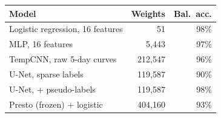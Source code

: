 \begin{tabular}{lrr}
\toprule
Model & Weights & Bal.\ acc. \\
\midrule
Logistic regression, 16 features & 51 & 98\% \\
MLP, 16 features & 5{,}443 & 97\% \\
TempCNN, raw 5-day curves & 212{,}547 & 96\% \\
U-Net, sparse labels & 119{,}587 & 90\% \\
U-Net, + pseudo-labels & 119{,}587 & 98\% \\
Presto (frozen) + logistic & 404{,}160 & 93\% \\
\bottomrule
\end{tabular}
